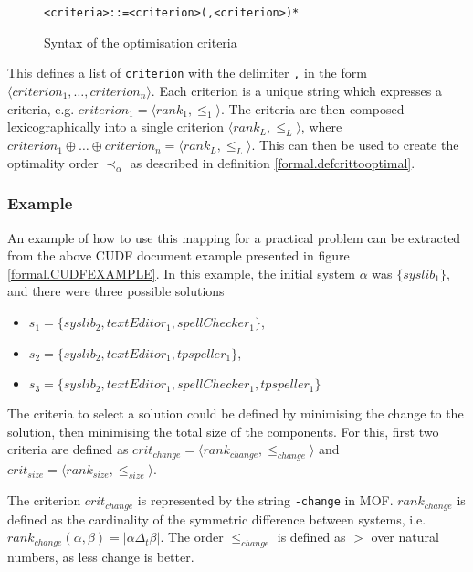 \begin{figure}[h!]
\begin{center}
\begin{alltt}
<criteria> ::= <criterion> (, <criterion>)*
\end{alltt}
  \caption{Syntax of the optimisation criteria}
  \label{formal.optbnf}
\end{center}
\end{figure}
This defines a list of \verb+criterion+ with the delimiter \verb+,+ in the form $\langle criterion_1, \ldots, criterion_n \rangle$.
Each criterion is a unique string which expresses a criteria, e.g. $criterion_1 = \langle rank_1, \leq_1 \rangle$.
The criteria are then composed lexicographically into a single criterion $\langle rank_L, \leq_L \rangle$, 
where $criterion_1 \oplus \ldots \oplus criterion_n = \langle rank_L, \leq_L \rangle$. 
This can then be used to create the optimality order $\prec_{\alpha}$ as described in definition \ref{formal.defcrittooptimal}.

\subsubsection{Example}
An example of how to use this mapping for a practical problem can be extracted from the above CUDF document example presented in figure \ref{formal.CUDFEXAMPLE}.
In this example, the initial system $\alpha$ was  $\{syslib_1\}$, and there were three possible solutions
\begin{itemize}
  \item $s_1 = \{syslib_2, textEditor_1, spellChecker_1\}$,
  \item $s_2 = \{syslib_2, textEditor_1, tpspeller_1\}$,
  \item $s_3 = \{syslib_2, textEditor_1, spellChecker_1, tpspeller_1\}$
\end{itemize}

The criteria to select a solution could be defined by minimising the change to the solution, then minimising the total size of the components.
For this, first two criteria are defined as $crit_{change} = \langle rank_{change}, \leq_{change} \rangle$ and $crit_{size} = \langle rank_{size}, \leq_{size} \rangle$.

The criterion $crit_{change}$ is represented by the string \verb+-change+ in MOF.
$rank_{change}$ is defined as the cardinality of the symmetric difference between systems, i.e. $rank_{change}(\alpha,\beta) = |\alpha \Delta_t \beta|$.
The order $\leq_{change}$ is defined as $>$ over natural numbers, as less change is better. 

